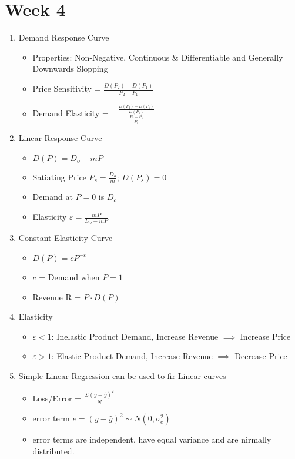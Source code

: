 \documentclass[a4paper]{article}
\begin{document}
\section{Week 4}
	\begin{enumerate}
		\item Demand Response Curve
		\begin{itemize}
			\item Properties: Non-Negative, Continuous \& Differentiable and Generally Downwards Slopping
			\item Price Sensitivity = $\frac{D(P_{2}) - D(P_{1})}{P_{2} - P_{1}}$
			\item Demand Elasticity = $-\frac{\frac{D(P_{2}) - D(P_{1})}{D(P_{1})}}{\frac{P_{2} - P_{1}}{P_{1}}}$
		\end{itemize}
		\item Linear Response Curve
		\begin{itemize}
			\item $D(P) = D_{o} - mP$
			\item Satiating Price $P_{s} = \frac{D_{o}}{m}$; $D(P_{s}) = 0$
			\item Demand at $P = 0$ is $D_{o}$
			\item Elasticity $\varepsilon = \frac{mP}{D_{o} - mP}$ 
		\end{itemize}
		\item Constant Elasticity Curve
		\begin{itemize}
			\item $D(P) = cP^{-\varepsilon}$
			\item $c$ = Demand when $P = 1$
			\item Revenue R = $P\cdot D(P)$
		\end{itemize}
		\item Elasticity
		\begin{itemize}
			\item $\varepsilon < 1$: Inelastic Product Demand, Increase Revenue $\implies$ Increase Price
			\item $\varepsilon > 1$: Elastic Product Demand, Increase Revenue $\implies$ Decrease Price
		\end{itemize}
		\item Simple Linear Regression can be used to fir Linear curves
		\begin{itemize}
			\item Loss/Error = $\frac{\Sigma (y - \hat{y})^{2}}{N}$
			\item error term $e = (y - \hat{y})^{2} \sim N(0,\sigma_{e}^{2})$
			\item error terms are independent, have equal variance and are nirmally distributed. 
		\end{itemize}
	\end{enumerate}
\end{document}
